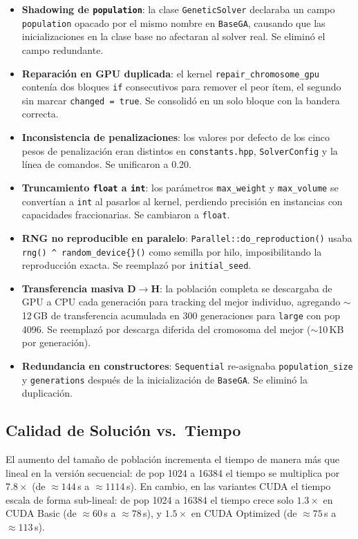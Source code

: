 \begin{itemize}
  \item \textbf{Shadowing de \texttt{population}}: la clase \texttt{GeneticSolver}
    declaraba un campo \texttt{population} opacado por el mismo nombre en
    \texttt{BaseGA}, causando que las inicializaciones en la clase base no
    afectaran al solver real. Se eliminó el campo redundante.
  \item \textbf{Reparación en GPU duplicada}: el kernel \texttt{repair\_chromosome\_gpu}
    contenía dos bloques \texttt{if} consecutivos para remover el peor ítem, el
    segundo sin marcar \texttt{changed = true}. Se consolidó en un solo bloque
    con la bandera correcta.
  \item \textbf{Inconsistencia de penalizaciones}: los valores por defecto de los
    cinco pesos de penalización eran distintos en \texttt{constants.hpp},
    \texttt{SolverConfig} y la línea de comandos. Se unificaron a 0.20.
  \item \textbf{Truncamiento \texttt{float} a \texttt{int}}: los parámetros
    \texttt{max\_weight} y \texttt{max\_volume} se convertían a \texttt{int} al
    pasarlos al kernel, perdiendo precisión en instancias con capacidades fraccionarias.
    Se cambiaron a \texttt{float}.
  \item \textbf{RNG no reproducible en paralelo}: \texttt{Parallel::do\_reproduction()}
    usaba \texttt{rng() \^{} random\_device\{\}()} como semilla por hilo,
    imposibilitando la reproducción exacta. Se reemplazó por \texttt{initial\_seed}.
  \item \textbf{Transferencia masiva D$\to$H}: la población completa se descargaba
    de GPU a CPU cada generación para tracking del mejor individuo, agregando
    $\sim$12\,GB de transferencia acumulada en 300 generaciones para
    \texttt{large} con pop 4096. Se reemplazó por descarga diferida del
    cromosoma del mejor ($\sim$10\,KB por generación).
  \item \textbf{Redundancia en constructores}: \texttt{Sequential} re-asignaba
    \texttt{population\_size} y \texttt{generations} después de la inicialización
    de \texttt{BaseGA}. Se eliminó la duplicación.
\end{itemize}

\subsection{Calidad de Solución vs.\ Tiempo}

El aumento del tamaño de población incrementa el tiempo de manera más que lineal en la versión secuencial: de pop 1024 a 16384 el tiempo se multiplica por $7.8\times$ (de $\approx 144$\,s a $\approx 1114$\,s). En cambio, en las variantes CUDA el tiempo escala de forma sub-lineal: de pop 1024 a 16384 el tiempo crece solo $1.3\times$ en CUDA Basic (de $\approx 60$\,s a $\approx 78$\,s), y $1.5\times$ en CUDA Optimized (de $\approx 75$\,s a $\approx 113$\,s).

